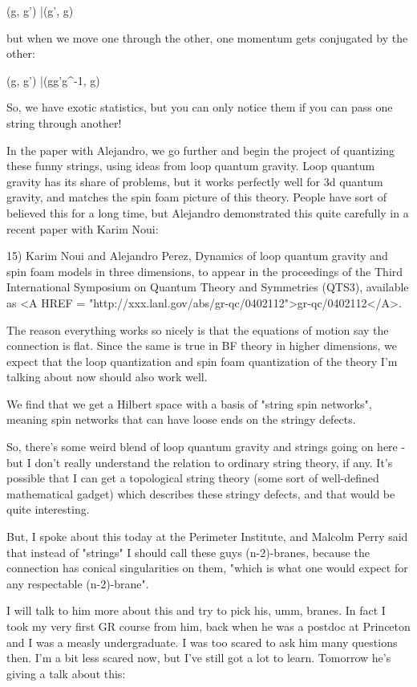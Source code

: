 (g, g') |\to  (g', g)

but when we move one through the other, one momentum gets conjugated
by the other:

(g, g') |\to  (gg'g^{-1}, g)

So, we have exotic statistics, but you can only notice them if you
can pass one string through another!

In the paper with Alejandro, we go further and begin the project of
quantizing these funny strings, using ideas from loop quantum gravity.
Loop quantum gravity has its share of problems, but it works perfectly
well for 3d quantum gravity, and matches the spin foam picture of this
theory.  People have sort of believed this for a long time, but 
Alejandro demonstrated this quite carefully in a recent paper with 
Karim Noui:

15) Karim Noui and Alejandro Perez, 
Dynamics of loop quantum gravity and spin foam models in three dimensions,
to appear in the proceedings of
the Third International Symposium on Quantum Theory and Symmetries 
(QTS3), available as <A HREF = "http://xxx.lanl.gov/abs/gr-qc/0402112">gr-qc/0402112</A>.

The reason everything works so nicely is that the equations of motion
say the connection is flat.  Since the same is true in BF theory in 
higher dimensions, we expect that the loop quantization and spin foam
quantization of the theory I'm talking about now should also work well.

We find that we get a Hilbert space with a basis of "string spin networks",
meaning spin networks that can have loose ends on the stringy defects.

So, there's some weird blend of loop quantum gravity and strings going
on here - but I don't really understand the relation to ordinary
string theory, if any.  It's possible that I can get a topological
string theory (some sort of well-defined mathematical gadget) which
describes these stringy defects, and that would be quite interesting.

But, I spoke about this today at the Perimeter Institute, and Malcolm
Perry said that instead of "strings" I should call these
guys (n-2)-branes, because the connection has conical singularities on
them, "which is what one would expect for any respectable
(n-2)-brane".

I will talk to him more about this and try to pick his, umm, branes.
In fact I took my very first GR course from him, back when he was a
postdoc at Princeton and I was a measly undergraduate.  I was too
scared to ask him many questions then.  I'm a bit less scared now,
but I've still got a lot to learn.  Tomorrow he's giving a talk about
this:

